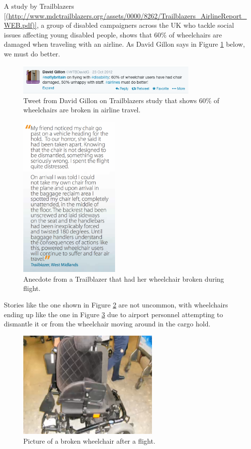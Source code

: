 A study by Trailblazers \ref{(http://www.mdctrailblazers.org/assets/0000/8262/Trailblazers_AirlineReport_WEB.pdf)}, a group of disabled campaigners across the UK who tackle social issues affecting young disabled people, shows that 60\% of wheelchairs are damaged when traveling with an airline. As David Gillon says in Figure \ref{fig:60percenttweet.png} below, we must do better. 


\begin{figure}[h]
  \centering
     \includegraphics[width=9cm]{images/60percenttweet.png}
   \caption{Tweet from David Gillon on Trailblazers study that shows 60\% of wheelchairs are broken in airline travel. }
  \label{fig:60percenttweet.png}
\end{figure}

\begin{figure}[h]
  \centering
     \includegraphics[width=5cm]{images/wheelchairstory.png}
   \caption{Anecdote from a Trailblazer that had her wheelchair broken during flight.}
  \label{fig:wheelchairstory.png}
\end{figure}

Stories like the one shown in Figure \ref{fig:wheelchairstory.png} are not uncommon, with wheelchairs ending up like the one in Figure \ref{fig:brokenwheelchair.png} due to airport personnel attempting to dismantle it or from the wheelchair moving around in the cargo hold. 


\begin{figure}[h]
  \centering
     \includegraphics[width=7cm]{images/brokenwheelchair.png}
   \caption{Picture of a broken wheelchair after a flight.}
  \label{fig:brokenwheelchair.png}
\end{figure}

